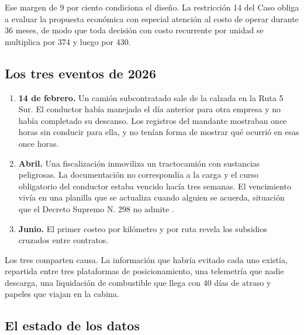 Ese margen de 9 por ciento condiciona el diseño. La restricción 14 del Caso obliga a evaluar la
propuesta económica con especial atención al costo de operar durante 36 meses, de modo que toda
decisión con costo recurrente por unidad se multiplica por 374 y luego por 430.

\subsection{Los tres eventos de 2026}

\begin{enumerate}
    \item \textbf{14 de febrero.} Un camión subcontratado sale de la calzada en la Ruta 5 Sur. El
    conductor había manejado el día anterior para otra empresa y no había completado su descanso.
    Los registros del mandante mostraban once horas sin conducir para ella, y no tenían forma de
    mostrar qué ocurrió en esas once horas.
    \item \textbf{Abril.} Una fiscalización inmoviliza un tractocamión con sustancias peligrosas. La
    documentación no correspondía a la carga y el curso obligatorio del conductor estaba vencido
    hacía tres semanas. El vencimiento vivía en una planilla que se actualiza cuando alguien se
    acuerda, situación que el Decreto Supremo N.\textordmasculine{} 298 no admite \parencite{ds298}.
    \item \textbf{Junio.} El primer costeo por kilómetro y por ruta revela los subsidios cruzados
    entre contratos.
\end{enumerate}

Los tres comparten causa. La información que habría evitado cada uno existía, repartida entre tres
plataformas de posicionamiento, una telemetría que nadie descarga, una liquidación de combustible
que llega con 40 días de atraso y papeles que viajan en la cabina.

\subsection{El estado de los datos}

